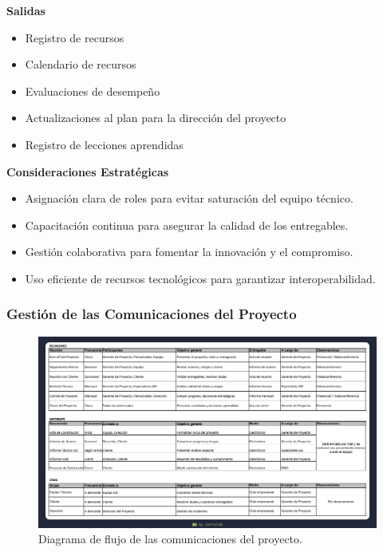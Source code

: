 \begin{multicols}{2}
\textbf{Salidas}
\begin{itemize}
    \item Registro de recursos
    \item Calendario de recursos
    \item Evaluaciones de desempeño
    \item Actualizaciones al plan para la dirección del proyecto
    \item Registro de lecciones aprendidas
\end{itemize}

\textbf{Consideraciones Estratégicas}
\begin{itemize}
    \item Asignación clara de roles para evitar saturación del equipo técnico.
    \item Capacitación continua para asegurar la calidad de los entregables.
    \item Gestión colaborativa para fomentar la innovación y el compromiso.
    \item Uso eficiente de recursos tecnológicos para garantizar interoperabilidad.
\end{itemize}

      \end{multicols}
\newpage
      \subsubsection{Gestión de las Comunicaciones del Proyecto}

      \begin{figure}[H]
        \centering
        \includegraphics[width=1.3\textwidth,angle=90,trim=1cm 1cm 1cm 1cm,clip]{assets/comunicaciones.png}
        \caption{Diagrama de flujo de las comunicaciones del proyecto.}
        \label{fig:comunicaciones}
      \end{figure}

